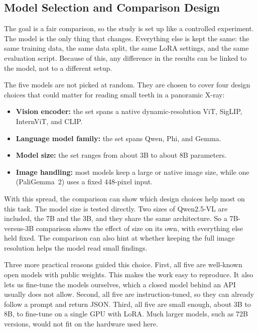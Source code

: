 \documentclass[a4paper,12pt]{report}
\begin{document}
\subsection{Model Selection and Comparison Design}

The goal is a fair comparison, so the study is set up like a controlled experiment. The model is the only thing that changes. Everything else is kept the same: the same training data, the same data split, the same LoRA settings, and the same evaluation script. Because of this, any difference in the results can be linked to the model, not to a different setup.

The five models are not picked at random. They are chosen to cover four design choices that could matter for reading small teeth in a panoramic X-ray:

\begin{itemize}
    \item \textbf{Vision encoder:} the set spans a native dynamic-resolution ViT, SigLIP, InternViT, and CLIP.
    \item \textbf{Language model family:} the set spans Qwen, Phi, and Gemma.
    \item \textbf{Model size:} the set ranges from about 3B to about 8B parameters.
    \item \textbf{Image handling:} most models keep a large or native image size, while one (PaliGemma~2) uses a fixed 448-pixel input.
\end{itemize}

With this spread, the comparison can show which design choices help most on this task. The model size is tested directly. Two sizes of Qwen2.5-VL are included, the 7B and the 3B, and they share the same architecture. So a 7B-versus-3B comparison shows the effect of size on its own, with everything else held fixed. The comparison can also hint at whether keeping the full image resolution helps the model read small findings.

Three more practical reasons guided this choice. First, all five are well-known open models with public weights. This makes the work easy to reproduce. It also lets us fine-tune the models ourselves, which a closed model behind an API usually does not allow. Second, all five are instruction-tuned, so they can already follow a prompt and return JSON. Third, all five are small enough, about 3B to 8B, to fine-tune on a single GPU with LoRA. Much larger models, such as 72B versions, would not fit on the hardware used here.
\end{document}

